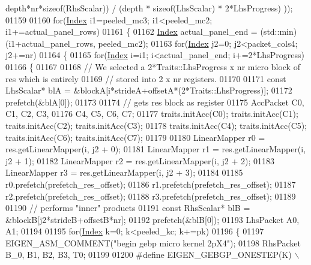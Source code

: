 \begin{DoxyCode}
      depth*nr*\textcolor{keyword}{sizeof}(RhsScalar)) / (depth * \textcolor{keyword}{sizeof}(LhsScalar) * 2*LhsProgress) ));
01159 
01160       \textcolor{keywordflow}{for}(\hyperlink{namespace_eigen_a62e77e0933482dafde8fe197d9a2cfde}{Index} i1=peeled\_mc3; i1<peeled\_mc2; i1+=actual\_panel\_rows)
01161       \{
01162         \hyperlink{namespace_eigen_a62e77e0933482dafde8fe197d9a2cfde}{Index} actual\_panel\_end = (std::min)(i1+actual\_panel\_rows, peeled\_mc2);
01163         \textcolor{keywordflow}{for}(\hyperlink{namespace_eigen_a62e77e0933482dafde8fe197d9a2cfde}{Index} j2=0; j2<packet\_cols4; j2+=nr)
01164         \{
01165           \textcolor{keywordflow}{for}(\hyperlink{namespace_eigen_a62e77e0933482dafde8fe197d9a2cfde}{Index} i=i1; i<actual\_panel\_end; i+=2*LhsProgress)
01166           \{
01167           
01168           \textcolor{comment}{// We selected a 2*Traits::LhsProgress x nr micro block of res which is entirely}
01169           \textcolor{comment}{// stored into 2 x nr registers.}
01170           
01171           \textcolor{keyword}{const} LhsScalar* blA = &blockA[i*strideA+offsetA*(2*Traits::LhsProgress)];
01172           prefetch(&blA[0]);
01173 
01174           \textcolor{comment}{// gets res block as register}
01175           AccPacket C0, C1, C2, C3,
01176                     C4, C5, C6, C7;
01177           traits.initAcc(C0); traits.initAcc(C1); traits.initAcc(C2); traits.initAcc(C3);
01178           traits.initAcc(C4); traits.initAcc(C5); traits.initAcc(C6); traits.initAcc(C7);
01179 
01180           LinearMapper r0 = res.getLinearMapper(i, j2 + 0);
01181           LinearMapper r1 = res.getLinearMapper(i, j2 + 1);
01182           LinearMapper r2 = res.getLinearMapper(i, j2 + 2);
01183           LinearMapper r3 = res.getLinearMapper(i, j2 + 3);
01184 
01185           r0.prefetch(prefetch\_res\_offset);
01186           r1.prefetch(prefetch\_res\_offset);
01187           r2.prefetch(prefetch\_res\_offset);
01188           r3.prefetch(prefetch\_res\_offset);
01189 
01190           \textcolor{comment}{// performs "inner" products}
01191           \textcolor{keyword}{const} RhsScalar* blB = &blockB[j2*strideB+offsetB*nr];
01192           prefetch(&blB[0]);
01193           LhsPacket A0, A1;
01194 
01195           \textcolor{keywordflow}{for}(\hyperlink{namespace_eigen_a62e77e0933482dafde8fe197d9a2cfde}{Index} k=0; k<peeled\_kc; k+=pk)
01196           \{
01197             EIGEN\_ASM\_COMMENT(\textcolor{stringliteral}{"begin gebp micro kernel 2pX4"});
01198             RhsPacket B\_0, B1, B2, B3, T0;
01199 
01200 \textcolor{preprocessor}{   #define EIGEN\_GEBGP\_ONESTEP(K) \(\backslash\)}

\end{DoxyCode}
